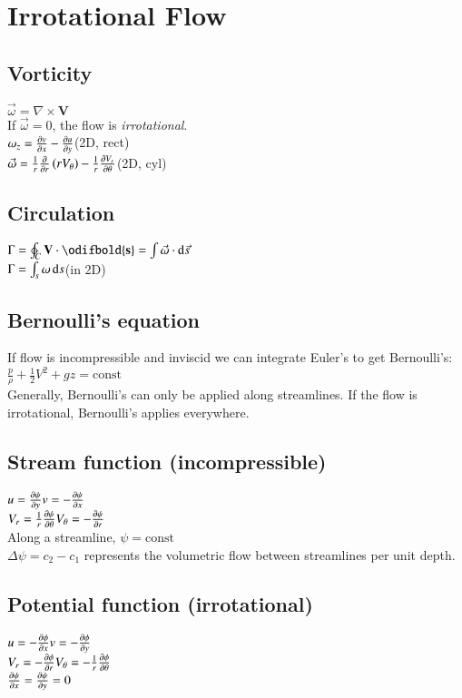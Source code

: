 \section{Irrotational Flow}
\subsection*{Vorticity}
$\vec{\omega} = \nabla \times \mathbf{V}$\\
If $\vec{\omega}=0$, the flow is \textit{irrotational}.\\
$\omega_z = \pdv{v}{x} - \pdv{u}{y}$\hfill(2D, rect)\\
$\vec{\omega} = \frac{1}{r} \pdv*[fun=true]{r V_\theta}{r} - \frac{1}{r} \pdv{V_r}{\theta}$\hfill(2D, cyl)
\subsection*{Circulation}
$\Gamma = \ointctrclockwise_C \mathbf{V} \cdot \odifbold{\mathbf{s}} = \int \vec{\omega} \cdot \odif{\vec{s}}$\\
$\Gamma = \int_s \omega \odif{s}$\hfill(in 2D)
\subsection*{Bernoulli's equation}
If flow is incompressible and inviscid we can integrate Euler's to get Bernoulli's:\\
$\frac{p}{\rho}+\frac{1}{2}V^2+gz=\text{const}$\\
Generally, Bernoulli's can only be applied along streamlines. If the flow is irrotational, Bernoulli's applies everywhere.
\subsection*{Stream function (incompressible)}
$u   = \pdv{\psi}{y}                   \hfill v      = -\pdv{\psi}{x}$\\
$V_r = \frac{1}{r}\pdv{\psi}{\theta} \hfill V_\theta = -\pdv{\psi}{r}$\\
Along a streamline, $\psi=\text{const}$\\
$\Delta\psi=c_2-c_1$ represents the volumetric flow between streamlines per unit depth.
\subsection*{Potential function (irrotational)}
$u   = -\pdv{\phi}{x} \hfill   v        = -\pdv{\phi}{y}$\\
$V_r = -\pdv{\phi}{r} \hfill   V_\theta = -\frac{1}{r} \pdv{\phi}{\theta}$\\
$\pdv{\psi}{x} = \pdv{\psi}{y} = 0$ \hfill{}

